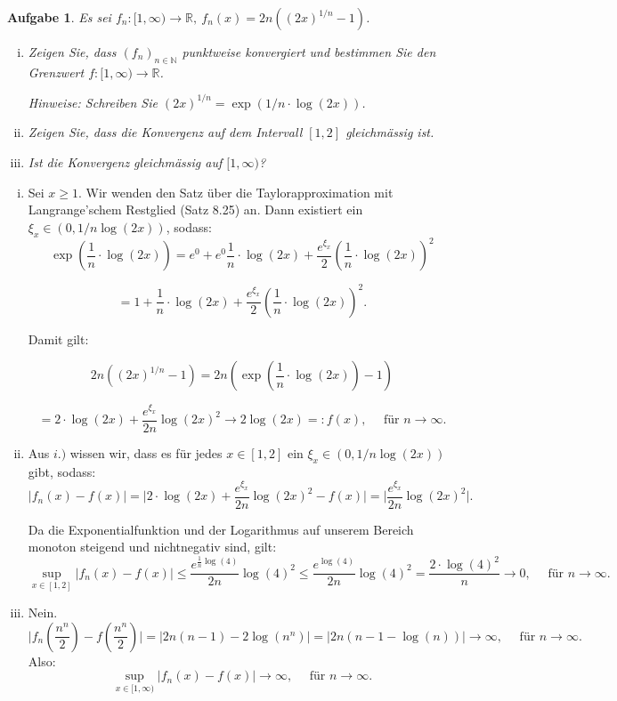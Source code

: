 \documentclass[a4paper, 20]{exam}
\newtheorem{ex}{Aufgabe}
\newcommand\RR{\mathbb{R}}
\newcommand\NN{\mathbb{N}}
\begin{document}
\begin{ex}
Es sei $f_n : [1, \infty) \longrightarrow \RR, \ f_n(x)= 2n \left( \left(2x \right)^{1/n} -1 \right)$.
\begin{enumerate}[i.)]
\item
Zeigen Sie, dass $(f_n)_{n\in \NN}$ punktweise konvergiert und bestimmen Sie den Grenzwert 
$f:[1, \infty) \longrightarrow \RR$.

Hinweise: Schreiben Sie $\left(2x \right)^{1/n}= \exp\left( 1/n \cdot \log(2x) \right)$.
\item
Zeigen Sie, dass die Konvergenz auf dem Intervall $[1,2]$ gleichm\"assig ist.
\item
Ist die Konvergenz gleichm\"assig auf $[1, \infty)$?
\end{enumerate}
\end{ex}
\begin{solution}
\begin{enumerate}[i.)]
\item
Sei $x \geq 1$. Wir wenden den Satz \"uber die Taylorapproximation mit Langrange'schem Restglied (Satz 8.25) an. Dann existiert ein $\xi_x \in (0, 1/n \log(2x))$, sodass:
$$ \exp\left( \frac{1}{n} \cdot \log(2x) \right) 
= e^0 + e^0\frac{1}{n} \cdot \log(2x) + \frac{e^{\xi_x}}{2} \left( \frac{1}{n} \cdot \log(2x) \right)^2$$

$$= 1 + \frac{1}{n} \cdot \log(2x) + \frac{e^{\xi_x}}{2} \left( \frac{1}{n} \cdot \log(2x) \right)^2.$$

Damit gilt:

$$ 2n \left( \left(2x \right)^{1/n} -1 \right)
= 2n \left( \exp\left( \frac{1}{n} \cdot \log(2x) \right) -1 \right) $$
 
$$= 2\cdot \log(2x) + \frac{e^{\xi_x}}{2n} \log(2x)^2 \longrightarrow 2\log(2x)=:f(x), \quad
 \text{ f\"ur } n\longrightarrow \infty.$$
 
\item
Aus $i.)$ wissen wir, dass es f\"ur jedes $x\in [1,2]$ ein $\xi_x \in (0, 1/n \log(2x))$ gibt, sodass:
$$ \vert f_n(x) - f(x) \vert 
= \bigg\vert 2\cdot \log(2x) + \frac{e^{\xi_x}}{2n} \log(2x)^2 - f(x) \bigg\vert
= \bigg\vert \frac{e^{\xi_x}}{2n} \log(2x)^2 \bigg\vert.$$

Da die Exponentialfunktion und der Logarithmus auf unserem Bereich monoton steigend und nichtnegativ sind, gilt:
$$ \sup_{x\in [1,2]} \vert f_n(x) - f(x) \vert
\leq \frac{e^{\frac{1}{n}\log(4)}}{2n} \log(4)^2
\leq \frac{e^{\log(4)}}{2n} \log(4)^2
= \frac{2 \cdot \log(4)^2}{ n} \longrightarrow 0, \quad \text{ f\"ur } n \longrightarrow \infty.$$
\item
Nein.
 $$\bigg\vert f_n\left(\frac{n^n}{2}\right) - f\left(\frac{n^n}{2}\right) \bigg\vert
 = \vert 2n \left( n - 1 \right) - 2\log(n^n) \vert
 = \vert 2n (n-1 - \log(n)) \vert \longrightarrow \infty, \quad \text{ f\"ur } n \longrightarrow \infty.$$
 Also: 
 $$\sup_{x\in [1, \infty)} \vert f_n(x) - f(x) \vert \longrightarrow \infty, \quad \text{ f\"ur } n \longrightarrow \infty.$$
\end{enumerate}
\end{solution}
\end{document}
